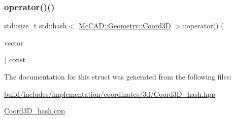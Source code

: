 \subsubsection{\texorpdfstring{operator()()}{operator()()}\hspace{0.1cm}{\footnotesize\ttfamily [2/2]}}
{\footnotesize\ttfamily std\+::size\+\_\+t std\+::hash$<$ \hyperlink{classMcCAD_1_1Geometry_1_1Coord3D}{Mc\+C\+A\+D\+::\+Geometry\+::\+Coord3D} $>$\+::operator() (\begin{DoxyParamCaption}\item[{const \hyperlink{classMcCAD_1_1Geometry_1_1Coord3D}{Mc\+C\+A\+D\+::\+Geometry\+::\+Coord3D} \&}]{vector }\end{DoxyParamCaption}) const}



The documentation for this struct was generated from the following files\+:\begin{DoxyCompactItemize}
\item 
\hyperlink{build_2includes_2implementation_2coordinates_23d_2Coord3D__hash_8hpp}{build/includes/implementation/coordinates/3d/\+Coord3\+D\+\_\+hash.\+hpp}\item 
\hyperlink{Coord3D__hash_8cpp}{Coord3\+D\+\_\+hash.\+cpp}\end{DoxyCompactItemize}
